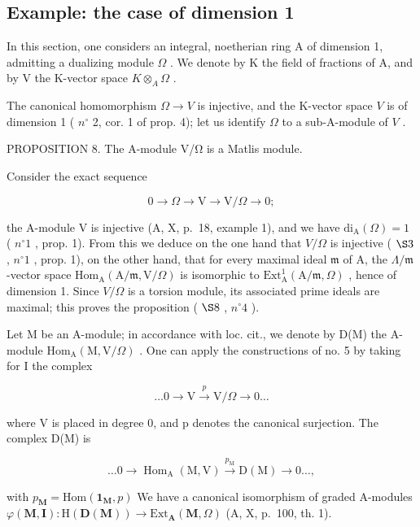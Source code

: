 \subsection{Example: the case of dimension 1}

In this section, one considers an integral, noetherian ring A of dimension 1, admitting a dualizing module \(\Omega\) . We denote by K the field of fractions of A, and by V the K-vector space \(K \otimes_{A} \Omega\) .

The canonical homomorphism \(\Omega\to V\) is injective, and the K-vector space \(V\) is of dimension 1 ( \(n^{\circ}\) 2, cor. 1 of prop. 4); let us identify \(\Omega\) to a sub-A-module of \(V\) .

PROPOSITION 8. The A-module V/Ω is a Matlis module.

Consider the exact sequence

\[
0 \to \Omega \to \mathrm{V} \to \mathrm{V} / \Omega \to 0;
\]

the A-module V is injective (A, X, p.~18, example 1), and we have \(\mathrm{di}_{\mathrm{A}}(\Omega) = 1\) ( \(n^{\circ} 1\) , prop. 1). From this we deduce on the one hand that \(V/\Omega\) is injective ( \(\S 3\) , \(n^{\circ} 1\) , prop. 1), on the other hand, that for every maximal ideal \(\mathfrak{m}\) of A, the \(\Lambda/\mathfrak{m}\) -vector space \(\mathrm{Hom}_{\mathrm{A}}(\mathrm{A}/\mathfrak{m}, \mathrm{V}/\Omega)\) is isomorphic to \(\mathrm{Ext}_{\mathrm{A}}^{1}(\mathrm{A}/\mathfrak{m}, \Omega)\) , hence of dimension 1. Since \(V/\Omega\) is a torsion module, its associated prime ideals are maximal; this proves the proposition ( \(\S 8\) , \(n^{\circ} 4\) ).

Let M be an A-module; in accordance with loc. cit., we denote by D(M) the A-module \(\mathrm{Hom}_{\mathrm{A}}(\mathrm{M},\mathrm{V}/\Omega)\) . One can apply the constructions of no. 5 by taking for I the complex

\[
\dots 0 \longrightarrow \mathrm{V} \xrightarrow {p} \mathrm{V} / \Omega \longrightarrow 0 \dots
\]

where V is placed in degree 0, and p denotes the canonical surjection. The complex D(M) is

\[
\dots 0 \longrightarrow \operatorname{Hom} _ {\mathrm{A}} (\mathrm{M}, \mathrm{V}) \xrightarrow {p _ {\mathrm{M}}} \mathrm{D} (\mathrm{M}) \longrightarrow 0 \dots ,
\]

with \(p_{\mathbf{M}} = \mathrm{Hom}(\mathbf{1}_{\mathbf{M}}, p)\) We have a canonical isomorphism of graded A-modules \(\varphi(\mathbf{M}, \mathbf{I}) : \mathrm{H}(\mathbf{D}(\mathbf{M})) \longrightarrow \mathrm{Ext}_{\mathbf{A}}(\mathbf{M}, \Omega)\) (A, X, p.~100, th. 1).

